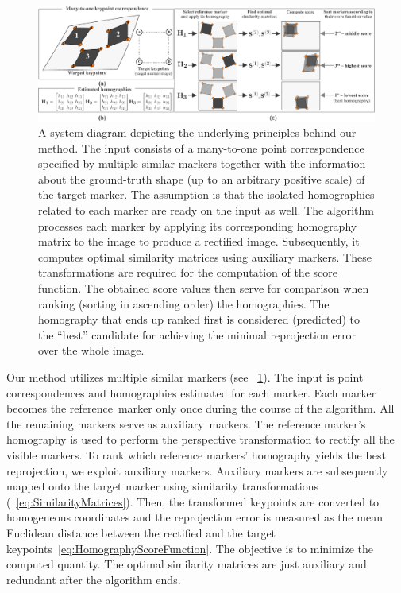 \begin{figure}[t]
    \centerline{\includegraphics[width=\linewidth]{figures/homography/system_diagram.pdf}}
    \caption[Homography ranking system diagram]{A system diagram depicting the underlying principles behind our method.  The input consists of a many-to-one point correspondence specified by multiple similar markers together with the information about the ground-truth shape (up to an arbitrary positive scale) of the target marker.  The assumption is that the isolated homographies related to each marker are ready on the input as well.  The algorithm processes each marker by applying its corresponding homography matrix to the image to produce a rectified image. Subsequently, it computes optimal similarity matrices using auxiliary markers. These transformations are required for the computation of the score function. The obtained score values then serve for comparison when ranking (sorting in ascending order) the homographies. The homography that ends up ranked first is considered (predicted) to the ``best'' candidate for achieving the minimal reprojection error over the whole image.}
    \label{fig:HomographySystemDiagram}
\end{figure}

Our method utilizes multiple similar markers (see \figstr{}~\ref{fig:HomographySystemDiagram}). The input is point correspondences and homographies estimated for each marker. Each marker becomes the \mbox{reference marker} only once during the course of the algorithm. All the remaining markers serve as \mbox{auxiliary markers}. The reference marker's homography is used to perform the perspective transformation to rectify all the visible markers. To rank which reference markers' homography yields the best reprojection, we exploit auxiliary markers. Auxiliary markers are subsequently mapped onto the target marker using similarity transformations (\eqstr{}~\ref{eq:SimilarityMatrices}). Then, the transformed keypoints are converted to homogeneous coordinates and the reprojection error is measured as the mean Euclidean distance between the rectified and the target keypoints~\ref{eq:HomographyScoreFunction}. The objective is to minimize the computed quantity. The optimal similarity matrices are just auxiliary and redundant after the algorithm ends.

